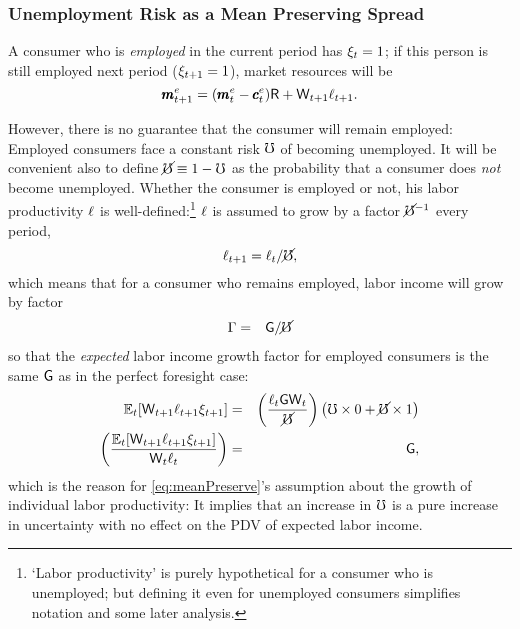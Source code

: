 \subsubsection{Unemployment Risk as a Mean Preserving Spread} \label{subsubsec:uMPS}
A consumer who is {\it employed} in the current
period has $\xi_{t}=1$; if this person is still employed next
period ($\xi_{t+1}=1$), market resources will be
\begin{equation}
\pmb{m}^{e}_{t+1} = (\pmb{m}^{e}_{t}-\pmb{c}^{e}_{t})\mathsf{R}+\mathsf{W}_{t+1}\ell_{t+1}. \label{eq:Metp1}
\end{equation}

However, there is no guarantee that the consumer will remain employed: Employed consumers face a constant risk $\mho$ of becoming unemployed.  %
It will be convenient also to define $\cancel{\mho}\equiv 1-\mho$ as the probability that a consumer does {\it not} become unemployed.  Whether the consumer is employed or not, his labor productivity $\ell$ is well-defined:\footnote{`Labor productivity' is purely hypothetical for a consumer who is unemployed; but defining it even for unemployed consumers simplifies notation and some later analysis.}  $\ell$ is assumed to grow by a factor $\cancel{\mho}^{-1}$ every period,
\begin{equation}
\ell_{t+1} =    \ell_{t}/\cancel{\mho} \label{eq:meanPreserve},
\end{equation}
which means that for a consumer who remains employed, labor income will grow by factor
\begin{eqnarray}
  \Gamma & = & \mathsf{G}/\cancel{\mho}
\end{eqnarray}
so that the {\it expected} labor income growth factor for
employed consumers is the same $\mathsf{G}$ as in the perfect foresight case:
\begin{eqnarray*}
  \operatorname{\mathbb{E}}_{t}[\mathsf{W}_{t+1}\ell_{t+1}\xi_{t+1}] & = &  \left(\frac{\ell_{t} \mathsf{G} \mathsf{W}_{t}}{\cancel{\mho}}\right)\left(\mho \times 0 + \cancel{\mho} \times 1 \right)
\\ \left(\frac{\operatorname{\mathbb{E}}_{t}[\mathsf{W}_{t+1}\ell_{t+1}\xi_{t+1}]}{\mathsf{W}_{t} \ell_{t}}\right) &  = & \mathsf{G}
,
\end{eqnarray*}
which is  the reason for \eqref{eq:meanPreserve}'s assumption about the growth of
individual labor productivity: It implies
that an increase in $\mho$ is a pure increase in uncertainty with no
effect on the PDV of expected labor income.

